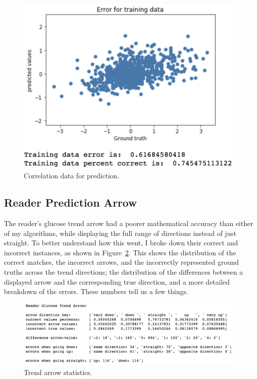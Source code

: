 \begin{figure}[ht]
\centering\includegraphics[width=1.0\linewidth]{images/graph8.png}
\caption{Correlation data for prediction.}
\label{fig:graph8}
\end{figure}

\subsection{Reader Prediction Arrow}
The reader’s glucose trend arrow had a poorer mathematical accuracy than either of my algorithms, while displaying the full range of directions instead of just straight. To better understand how this went, I broke down their correct and incorrect instances, as shown in Figure~\ref{fig:graph9}. This shows the distribution of the correct matches, the incorrect arrows, and the incorrectly represented ground truths across the trend directions; the distribution of the differences between a displayed arrow and the corresponding true direction, and a more detailed breakdown of the errors. These numbers tell us a few things.

\begin{figure}[H]
\centering\includegraphics[width=1.0\linewidth]{images/graph9.png}
\caption{Trend arrow statistics.}
\label{fig:graph9}
\end{figure}


